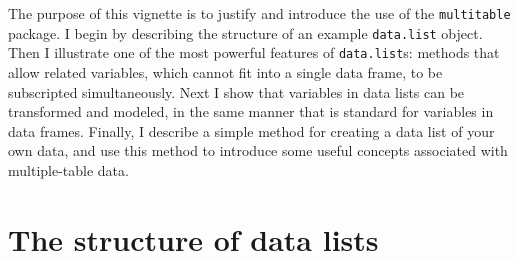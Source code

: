 \documentclass{article}
\newcommand{\code}[1]{\texttt{#1}}
\numberwithin{exercise}{section}
\begin{document}
The purpose of this vignette is to justify and introduce the use of the \code{multitable} package.  I begin by describing the structure of an example \code{data.list} object.  Then I illustrate one of the most powerful features of \code{data.list}s:  methods that allow related variables, which cannot fit into a single data frame, to be subscripted simultaneously.  Next I show that variables in data lists can be transformed and modeled, in the same manner that is standard for variables in data frames.  Finally, I describe a simple method for creating a data list of your own data, and use this method to introduce some useful concepts associated with multiple-table data.

\newpage
\section{The structure of data lists}
\end{document}
